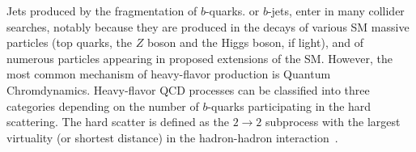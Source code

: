 Jets produced by the fragmentation of $b$-quarks. or $b$-jets, enter in many collider searches, notably because they are produced in the decays of various SM massive particles (top quarks, the $Z$ boson and the Higgs boson, if light), and of numerous particles appearing in proposed extensions of the SM. However, the most common mechanism of heavy-flavor production is Quantum Chromdynamics. Heavy-flavor QCD processes can be classified into three categories 
depending on the number of $b$-quarks participating in the hard scattering. The hard scatter is defined as the $2 \rightarrow 2$ subprocess with the largest virtuality (or shortest distance) in the hadron-hadron interaction~\cite{Norrbin:2000zc}.



